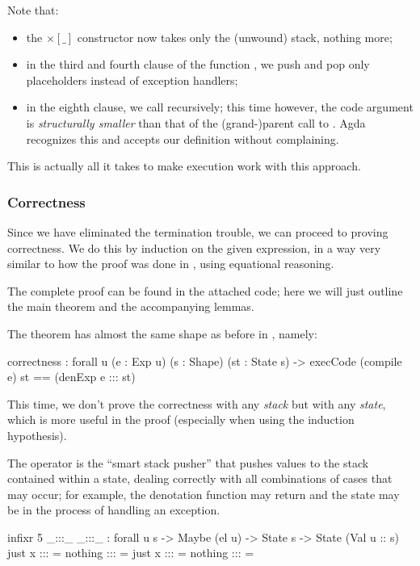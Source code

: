 \noindent Note that:
\begin{itemize}
	\item the $\times[\_]$ constructor now takes only the (unwound) stack, nothing more;
	\item in the third and fourth clause of the function ,
		we push and pop only placeholders instead of exception handlers;
	\item in the eighth clause, we call  recursively; this time however,
		the code argument  is \emph{structurally smaller} than that of
		the (grand-)parent call to . Agda recognizes this and
		accepts our definition without complaining.
\end{itemize}
This is actually all it takes to make execution work with this approach.

\subsubsection{Correctness}

Since we have eliminated the termination trouble, we can proceed to proving
correctness. We do this by induction on the given expression, in a way
very similar to how the proof was done in , using
equational reasoning.

 The complete proof can be found
in the attached code; here we will just outline the main theorem and the
accompanying lemmas.

The theorem has almost the same shape as before in ,
namely:
\begin{code}
  correctness : forall {u} (e : Exp u) (s : Shape) (st : State s)
    -> execCode (compile e) st == (denExp e ::: st)
\end{code}

\noindent This time, we don't prove the correctness with any \emph{stack} but
with any \emph{state}, which is more useful in the proof (especially when
using the induction hypothesis).

The operator \ident{:::} is the ``smart stack pusher'' that pushes values
to the stack contained within a state, dealing correctly with all combinations
of cases that may occur; for example, the denotation function 
may return  and the state  may be in the process
of handling an exception.

\begin{codei}
  infixr 5 _:::_
  _:::_ : forall {u s} -> Maybe (el u) -> State s -> State (Val u :: s)
  just x	:::	\tick[ st ]		= \tick[ x \scons st ]
  nothing	:::	\tick[ st ]		= 
  just x	:::	\x[ n , st ]	= \x[ n , st ]
  nothing	:::	\x[ n , st ]	= \x[ n , st ]
\end{codei}

